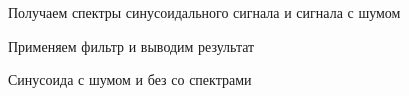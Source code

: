 \documentclass[12pt,a4paper]{scrartcl}
\begin{document}
\begin{figure}[h!]
\caption{Получаем спектры синусоидального сигнала и сигнала с шумом}
\end{figure}

\begin{figure}[h!]
\caption{Применяем фильтр и выводим результат}
\end{figure}
\newpage

\begin{figure}[h!]
\caption{Синусоида с шумом и без со спектрами}
\end{figure}
\newpage
\end{document}
